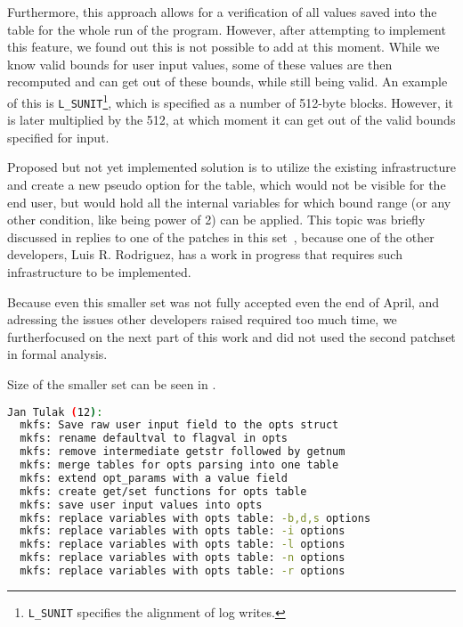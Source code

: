 \begin{desciption}
Furthermore, this approach allows for a verification of all values saved into
the table for the whole run of the program. However, after attempting to
implement this feature, we found out this is not possible to add at this moment.
While we know valid bounds for user input values, some of these values are then
recomputed and can get out of these bounds, while still being valid. An example
of this is {\tt L\_SUNIT}\footnote{{\tt L\_SUNIT} specifies the alignment of
log writes.}, which is specified as a number of 512-byte blocks. However, it is
later multiplied by the 512, at which moment it can get out of the valid bounds
specified for input.

Proposed but not yet implemented solution is to utilize the existing
infrastructure and create a new pseudo option for the table, which would not be
visible for the end user, but would hold all the internal variables for which
bound range (or any other condition, like being power of 2) can be applied.
This topic was briefly discussed in replies to one of the patches in this
set~\cite{secondSetSplitOtherVars}, because one of the other developers, Luis
R. Rodriguez, has a work in progress that requires such infrastructure to be
implemented.

Because even this smaller set was not fully accepted even the end of April,
and adressing the issues other developers raised required too much time, we
furtherfocused on the next part of
this work and did not used the second patchset in formal analysis.

Size of the smaller set can be seen in
.
\begin{lstlisting}[frame=none, basicstyle=\footnotesize\ttfamily,
language=Bash, numbers=none, numberstyle=\tiny\color{black},caption= {Git
statistics for the first part of the second set after its breaking into
smaller parts~\cite{secondSetSplitFirst}.},
label={lst:refactoring:firstSmallerGit}]
Jan Tulak (12):
  mkfs: Save raw user input field to the opts struct
  mkfs: rename defaultval to flagval in opts
  mkfs: remove intermediate getstr followed by getnum
  mkfs: merge tables for opts parsing into one table
  mkfs: extend opt_params with a value field
  mkfs: create get/set functions for opts table
  mkfs: save user input values into opts
  mkfs: replace variables with opts table: -b,d,s options
  mkfs: replace variables with opts table: -i options
  mkfs: replace variables with opts table: -l options
  mkfs: replace variables with opts table: -n options
  mkfs: replace variables with opts table: -r options


\end{lstlisting}
\end{desciption}

